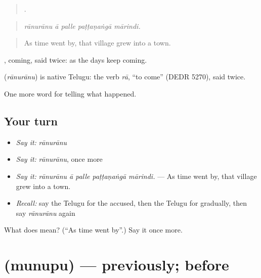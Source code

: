 \begin{quote}
    .
\end{quote}

\begin{quote}
\emph{rānurānu ā palle paṭṭaṇaṅgā mārindi.}
\end{quote}

\begin{quote}
As time went by, that village grew into a town.
\end{quote}

, coming, said twice: as the days keep coming.

\begin{cousinweb}
\textbf{} (\emph{rānurānu}) is native Telugu: the verb \emph{rā}, \textquotedblleft{}to come\textquotedblright{} (DEDR 5270), said twice.
\end{cousinweb}

\begin{grammarlens}[title={What you've built}]
One more word for telling what happened.
\end{grammarlens}

\subsection*{Your turn}
\begin{itemize}
\raggedright
  \item \emph{Say it:} \emph{rānurānu}
  \item \emph{Say it:} \emph{rānurānu}, once more
  \item \emph{Say it:} \emph{rānurānu ā palle paṭṭaṇaṅgā mārindi.} — As time went by, that village grew into a town.
  \item \emph{Recall:} say the Telugu for the accused, then the Telugu for gradually, then say \emph{rānurānu} again
\end{itemize}

\begin{tcolorbox}[breakable,colback=teal!4,colframe=teal!35!black,title={Before you move on}]
What does  mean? (\textquotedblleft{}As time went by\textquotedblright{}.) Say it once more.
\end{tcolorbox}
\section[\texorpdfstring{\te{మునుపు} (munupu)}{మునుపు (munupu)}]{ (munupu) — previously; before}

